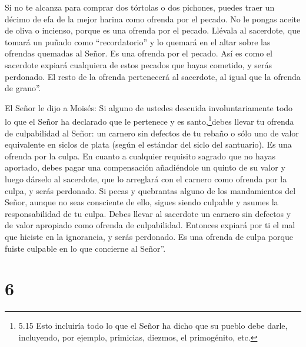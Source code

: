  Si no te alcanza para comprar dos tórtolas o dos pichones,
puedes traer un décimo de efa de la mejor harina como ofrenda por el
pecado. No le pongas aceite de oliva o incienso, porque es una ofrenda
por el pecado.  Llévala al sacerdote, que tomará un puñado
como ``recordatorio'' y lo quemará en el altar sobre las ofrendas
quemadas al Señor. Es una ofrenda por el pecado.  Así es
como el sacerdote expiará cualquiera de estos pecados que hayas
cometido, y serás perdonado. El resto de la ofrenda pertenecerá al
sacerdote, al igual que la ofrenda de grano''.

 El Señor le dijo a Moisés:  Si alguno de
ustedes descuida involuntariamente todo lo que el Señor ha declarado que
le pertenece y es santo,\footnote{5.15 Esto incluiría todo lo que el
  Señor ha dicho que su pueblo debe darle, incluyendo, por ejemplo,
  primicias, diezmos, el primogénito, etc.}debes llevar tu ofrenda de
culpabilidad al Señor: un carnero sin defectos de tu rebaño o sólo uno
de valor equivalente en siclos de plata (según el estándar del siclo del
santuario). Es una ofrenda por la culpa.  En cuanto a
cualquier requisito sagrado que no hayas aportado, debes pagar una
compensación añadiéndole un quinto de su valor y luego dárselo al
sacerdote, que lo arreglará con el carnero como ofrenda por la culpa, y
serás perdonado.  Si pecas y quebrantas alguno de los
mandamientos del Señor, aunque no seas consciente de ello, sigues siendo
culpable y asumes la responsabilidad de tu culpa.  Debes
llevar al sacerdote un carnero sin defectos y de valor apropiado como
ofrenda de culpabilidad. Entonces expiará por ti el mal que hiciste en
la ignorancia, y serás perdonado.  Es una ofrenda de culpa
porque fuiste culpable en lo que concierne al Señor''.

\hypertarget{section-5}{%
\section{6}\label{section-5}}

